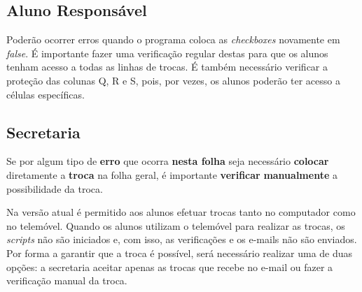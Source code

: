 \subsection{Aluno Responsável}

Poderão ocorrer erros quando o programa coloca as \textit{checkboxes} novamente em \textit{false}. É importante fazer uma verificação regular destas para que os alunos tenham acesso a todas as linhas de trocas. É também necessário verificar a proteção das colunas Q, R e S, pois, por vezes, os alunos poderão ter acesso a células específicas.

\subsection{Secretaria}

Se por algum tipo de \textbf{erro} que ocorra \textbf{nesta folha} seja necessário \textbf{colocar} diretamente a \textbf{troca} na folha geral, é importante \textbf{verificar} \textbf{manualmente} a possibilidade da troca.

Na versão atual é permitido aos alunos efetuar trocas tanto no computador como no telemóvel. Quando os alunos utilizam o telemóvel para realizar as trocas, os \textit{scripts} não são iniciados e, com isso, as verificações e os e-mails não são enviados. Por forma a garantir que a troca é possível, será necessário realizar uma de duas opções: a secretaria aceitar apenas as trocas que recebe no e-mail ou fazer a verificação manual da troca.


